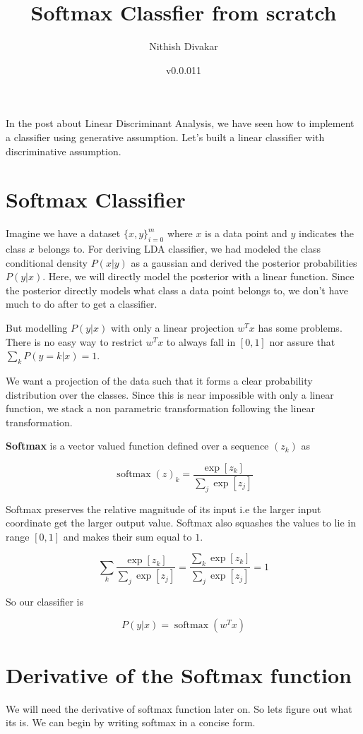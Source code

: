 \documentclass[10pt]{article}
\title{Softmax Classfier from scratch}
\author{Nithish Divakar}
\date{v0.0.011}
\begin{document}
\maketitle
In the post about Linear Discriminant Analysis, we have seen how to implement a classifier using generative assumption. Let's built a linear classifier with discriminative assumption. 
\tableofcontents
\section{Softmax Classifier}
Imagine we have a dataset $\{x,y\}_{i=0}^m$ where $x$ is a data point and $y$ indicates the class $x$ belongs to. For deriving LDA classifier, we had modeled the class conditional density $P(x|y)$ as a gaussian and derived the posterior probabilities $P(y|x)$. Here, we will directly model the posterior with a linear function. Since the posterior directly models what class a data point belongs to, we don't have much to do after to get a classifier.

But modelling $P(y|x)$ with only a linear projection $w^Tx$ has some problems. There is no easy way to restrict $w^Tx$ to always fall in $[0,1]$ nor assure that $\sum_k P(y=k|x) = 1$.
 
We want a projection of the data such that it forms a clear probability distribution over the classes. Since this is near impossible with only a linear function, we stack a non parametric transformation following the linear transformation. 

\textbf{Softmax} is a vector valued function defined over a sequence $(z_k)$ as

$$
\operatorname{softmax}(z)_k = \frac{\operatorname{exp}[z_k]}{\sum_j\operatorname{exp}[z_j]}
$$

Softmax preserves the relative magnitude of its input i.e the larger input coordinate get the larger output value. Softmax also squashes the values to lie in range $[0,1]$ and makes their sum equal to $1$. 

$$\sum_k \frac{\operatorname{exp}[z_k]}{\sum_j\operatorname{exp}[z_j]} = \frac{\sum_k \operatorname{exp}[z_k]}{\sum_j\operatorname{exp}[z_j]}  = 1$$

So our classifier is

$$
P(y|x) = \operatorname{softmax}(w^Tx)
$$


\section{Derivative of the Softmax function}
We will need the derivative of softmax function later on. So lets figure out what its is. We can begin by writing softmax in a concise form.
\end{document}

